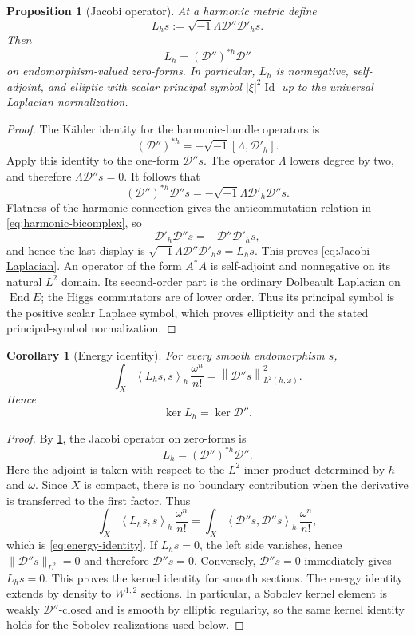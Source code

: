 \documentclass[11pt,reqno]{amsart}
\newtheorem{proposition}[theorem]{Proposition}
\newtheorem{corollary}[theorem]{Corollary}
\theoremstyle{definition}
\theoremstyle{remark}
\newcommand{\cD}{\mathcal D}
\newcommand{\End}{\operatorname{End}}
\newcommand{\Id}{\operatorname{Id}}
\newcommand{\ip}[2]{\left\langle #1,#2\right\rangle}
\newcommand{\norm}[1]{\left\lVert #1\right\rVert}
\newcommand{\abs}[1]{\left\lvert #1\right\rvert}
\begin{document}
\begin{proposition}[Jacobi operator]\label{prop:Jacobi}
At a harmonic metric define
\begin{equation}\label{eq:Jacobi-definition}
  L_hs
  :=\sqrt{-1}\Lambda\cD''\cD'_hs.
\end{equation}
Then
\begin{equation}\label{eq:Jacobi-Laplacian}
  L_h=(\cD'')^{*h}\cD''
\end{equation}
on endomorphism-valued zero-forms.  In particular, $L_h$ is nonnegative, self-adjoint, and elliptic with scalar principal symbol $\abs{\xi}^2\Id$ up to the universal Laplacian normalization.
\end{proposition}

\begin{proof}
The K\"ahler identity for the harmonic-bundle operators is
\[
  (\cD'')^{*h}=-\sqrt{-1}[\Lambda,\cD'_h].
\]
Apply this identity to the one-form $\cD''s$.  The operator $\Lambda$
lowers degree by two, and therefore $\Lambda\cD''s=0$.  It follows that
\[
  (\cD'')^{*h}\cD''s
  =-\sqrt{-1}\Lambda\cD'_h\cD''s.
\]
Flatness of the harmonic connection gives the anticommutation relation
in \eqref{eq:harmonic-bicomplex}, so
\[
  \cD'_h\cD''s=-\cD''\cD'_hs,
\]
and hence the last display is
$\sqrt{-1}\Lambda\cD''\cD'_hs=L_hs$.  This proves
\eqref{eq:Jacobi-Laplacian}.  An operator of the form $A^*A$ is
self-adjoint and nonnegative on its natural $L^2$ domain.  Its
second-order part is the ordinary Dolbeault Laplacian on $\End E$;
the Higgs commutators are of lower order.  Thus its principal symbol is
the positive scalar Laplace symbol, which proves ellipticity and the
stated principal-symbol normalization.
\end{proof}

\begin{corollary}[Energy identity]\label{cor:energy-identity}
For every smooth endomorphism $s$,
\begin{equation}\label{eq:energy-identity}
  \int_X\ip{L_hs}{s}_h\,\frac{\omega^n}{n!}
  =\norm{\cD''s}_{L^2(h,\omega)}^2.
\end{equation}
Hence
\[
  \ker L_h=\ker\cD''.
\]
\end{corollary}

\begin{proof}
By \cref{prop:Jacobi}, the Jacobi operator on zero-forms is
\[
  L_h=(\cD'')^{*h}\cD''.
\]
Here the adjoint is taken with respect to the $L^2$ inner product determined by $h$ and $\omega$.  Since $X$ is compact, there is no boundary contribution when the derivative is transferred to the first factor.  Thus
\[
  \int_X\ip{L_hs}{s}_h\,\frac{\omega^n}{n!}
  =\int_X\ip{\cD''s}{\cD''s}_h\,\frac{\omega^n}{n!},
\]
which is \eqref{eq:energy-identity}.  If $L_hs=0$, the left side
vanishes, hence $\|\cD''s\|_{L^2}=0$ and therefore $\cD''s=0$.
Conversely, $\cD''s=0$ immediately gives $L_hs=0$.  This proves the
kernel identity for smooth sections.  The energy identity extends by
density to $W^{1,2}$ sections.  In particular, a Sobolev kernel element
is weakly $\cD''$-closed and is smooth by elliptic regularity, so the
same kernel identity holds for the Sobolev realizations used below.
\end{proof}
\end{document}
